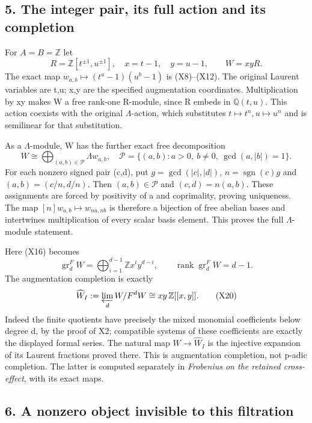 \documentclass[
]{article}
\begin{document}
\subsection{5. The integer pair, its full action and its
completion}\label{the-integer-pair-its-full-action-and-its-completion}

For \(A=B=\mathbb Z\) let \[
R=\mathbb Z[t^{\pm1},u^{\pm1}],\quad x=t-1,\quad y=u-1,
\qquad W=xyR.
\tag{X17}
\] The exact map \(w_{a,b}\mapsto(t^a-1)(u^b-1)\) is (X8)--(X12). The
original Laurent variables are t,u; x,y are the specified augmentation
coordinates. Multiplication by xy makes W a free rank-one R-module,
since R embeds in \(\mathbb Q(t,u)\). This action coexists with the
original \(\Lambda\)-action, which substitutes
\(t\mapsto t^n,u\mapsto u^n\) and is semilinear for that substitution.

As a \(\Lambda\)-module, W has the further exact free decomposition \[
W\cong\bigoplus_{(a,b)\in\mathcal P}\Lambda w_{a,b},
\quad
\mathcal P=\{(a,b):a>0,\ b\ne0,\ \gcd(a,|b|)=1\}.
\tag{X18}
\] For each nonzero signed pair (c,d), put \(g=\gcd(|c|,|d|)\),
\(n=\operatorname{sgn}(c)g\) and \((a,b)=(c/n,d/n)\). Then
\((a,b)\in\mathcal P\) and \((c,d)=n(a,b)\). These assignments are
forced by positivity of a and coprimality, proving uniqueness. The map
\([n]w_{a,b}\mapsto w_{na,nb}\) is therefore a bijection of free abelian
bases and intertwines multiplication of every scalar basis element. This
proves the full \(\Lambda\)-module statement.

Here (X16) becomes \[
\operatorname{gr}_d^FW=\bigoplus_{i=1}^{d-1}\mathbb Zx^iy^{d-i},
\qquad\operatorname{rank}\operatorname{gr}_d^FW=d-1.
\tag{X19}
\] The augmentation completion is exactly \[
\widehat W_I:=\varprojlim_d W/F^dW
\cong xy\,\mathbb Z[[x,y]].
\tag{X20}
\] Indeed the finite quotients have precisely the mixed monomial
coefficients below degree d, by the proof of X2; compatible systems of
these coefficients are exactly the displayed formal series. The natural
map \(W\to\widehat W_I\) is the injective expansion of its Laurent
fractions proved there. This is augmentation completion, not p-adic
completion. The latter is computed separately in \emph{Frobenius on the
retained cross-effect}, with its exact maps.

\subsection{6. A nonzero object invisible to this
filtration}\label{a-nonzero-object-invisible-to-this-filtration}
\end{document}
